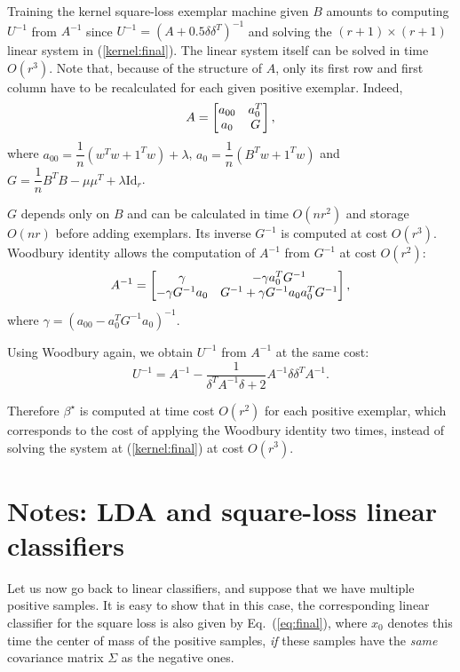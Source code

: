 \documentclass[12pt,letterpaper]{article}
\begin{document}
Training the kernel square-loss exemplar machine given $B$ amounts to computing
$U^{-1}$ from $A^{-1}$ since $U^{-1} = \left(A+0.5\delta\delta^T\right)^{-1}$
and solving the $(r+1)\times (r+1)$ linear system in (\ref{kernel:final}). The linear system itself can be solved in time $O(r^3)$.
Note that, because of the structure of $A$, only its first row and first column have to be recalculated for each given positive exemplar. 
Indeed,
\begin{equation}
A = \left[\begin{matrix}a_{00} & a_0^T\\ a_0 & G\end{matrix}\right],
\end{equation}
where $a_{00}=\dfrac{1}{n}(w^Tw+\text{1}^Tw)+\lambda$, $a_0 = \dfrac{1}{n}(B^Tw+\text{1}^Tw)$ and $G=\dfrac{1}{n}B^TB-\mu\mu^T+\lambda\text{Id}_r$.

$G$ depends only on $B$ and can be calculated in time $O(nr^2)$ and storage $O(nr)$ before adding exemplars. Its inverse $G^{-1}$ is computed at cost $O(r^3)$.
Woodbury identity allows the computation of $A^{-1}$ from $G^{-1}$ at cost $O(r^2)$:
\begin{equation}
A^{-1} = \left[\begin{matrix}\gamma & -\gamma a_0^TG^{-1}\\ -\gamma G^{-1}a_0 & G^{-1}+\gamma G^{-1}a_0a_0^TG^{-1}\end{matrix}\right],
\end{equation}
where $\gamma = \left(a_{00}-a_0^TG^{-1}a_0\right)^{-1}$.

Using Woodbury again, we obtain $U^{-1}$ from $A^{-1}$ at the same cost:
\begin{equation}
U^{-1} = A^{-1} - \dfrac{1}{\delta^TA^{-1}\delta+2}A^{-1}\delta \delta^TA^{-1}.
\end{equation}

Therefore $\beta^\star$ is computed at time cost $O(r^2)$ for each positive exemplar, which corresponds to the cost of applying the Woodbury identity two times,
instead of solving the system at (\ref{kernel:final}) at cost $O(r^3)$.
\section{Notes: LDA and square-loss linear classifiers}
Let us now go back to linear classifiers, and suppose that we have
multiple positive samples. It is easy to show that in this case, the
corresponding linear classifier for the square loss is also given by
Eq.~(\ref{eq:final}), where $x_0$ denotes this time the center of mass
of the positive samples, {\em if} these samples have the {\em same}
covariance matrix $\Sigma$ as the negative ones.
\end{document}
